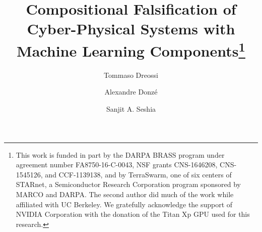 \documentclass[smallextended]{svjour3}
\begin{document}

\title{Compositional Falsification of Cyber-Physical Systems with Machine Learning Components\thanks{This work is funded in part by the DARPA BRASS program under agreement number FA8750-16-C-0043, NSF grants CNS-1646208, CNS-1545126, and CCF-1139138,
and by TerraSwarm, one of six centers of STARnet, a Semiconductor Research Corporation program sponsored by MARCO and DARPA. The second author did much of the work while affiliated with UC Berkeley. We gratefully acknowledge the support of NVIDIA Corporation with the donation of the Titan Xp GPU used for this research.}}



%
%
\author{Tommaso Dreossi \and Alexandre Donz\'e \and Sanjit A. Seshia}
%


%
%

\maketitle
\end{document}
